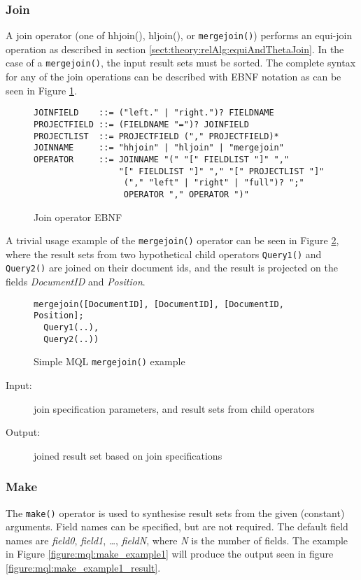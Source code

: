 \subsubsection{Join}
A join operator (one of \textsf{hhjoin()}, \textsf{hljoin()}, or
\texttt{mergejoin()}) performs an equi-join operation as described in section
\ref{sect:theory:relAlg:equiAndThetaJoin}. In the case of a
\texttt{mergejoin()}, the input result sets must be sorted. The complete syntax
for any of the join operations can be described with EBNF notation as can be
seen in Figure \ref{figure:mql:ebnf:join}.
\begin{figure}[!h]
\centering
\begin{Verbatim}
JOINFIELD    ::= ("left." | "right.")? FIELDNAME
PROJECTFIELD ::= (FIELDNAME "=")? JOINFIELD
PROJECTLIST  ::= PROJECTFIELD ("," PROJECTFIELD)*
JOINNAME     ::= "hhjoin" | "hljoin" | "mergejoin"
OPERATOR     ::= JOINNAME "(" "[" FIELDLIST "]" "," 
                 "[" FIELDLIST "]" "," "[" PROJECTLIST "]"
                  ("," "left" | "right" | "full")? ";"
                  OPERATOR "," OPERATOR ")"
\end{Verbatim}
\caption{Join operator EBNF}
\label{figure:mql:ebnf:join}
\end{figure}
A trivial usage example of the \texttt{mergejoin()} operator can be seen in
Figure \ref{figure:mql:mergejoin_example}, where the result sets from two
hypothetical child operators \texttt{Query1()} and \texttt{Query2()} are joined
on their document ids, and the result is projected on the
fields \textit{DocumentID} and \textit{Position}.

\begin{figure}[!h]
\centering
\begin{Verbatim}
mergejoin([DocumentID], [DocumentID], [DocumentID, Position]; 
  Query1(..),
  Query2(..))
\end{Verbatim}
\caption{Simple MQL \texttt{mergejoin()} example}
\label{figure:mql:mergejoin_example}
\end{figure}

\begin{description}
  \item[Input:] join specification parameters, and result sets from child
operators
  \item[Output:] joined result set based on join specifications
\end{description}

\subsubsection{Make}
The \texttt{make()} operator is used to synthesise result sets from the given
(constant) arguments. Field names can be specified, but are not required. The
default field names are \textit{field0}, \textit{field1}, \ldots,
\textit{fieldN}, where \textit{N} is the number of fields. The example in
Figure \ref{figure:mql:make_example1} will produce the output seen in figure
\ref{figure:mql:make_example1_result}.

